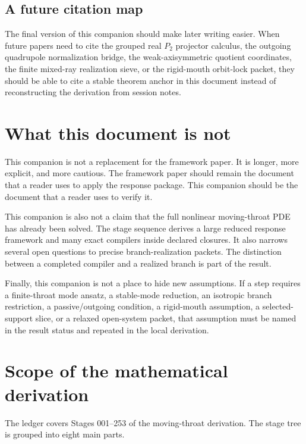 \subsection{A future citation map}

The final version of this companion should make later writing easier.  When future papers need to cite the grouped real \(P_2\) projector calculus, the outgoing quadrupole normalization bridge, the weak-axisymmetric quotient coordinates, the finite mixed-ray realization sieve, or the rigid-mouth orbit-lock packet, they should be able to cite a stable theorem anchor in this document instead of reconstructing the derivation from session notes.

\section{What this document is not}

This companion is not a replacement for the framework paper.  It is longer, more explicit, and more cautious.  The framework paper should remain the document that a reader uses to apply the response package.  This companion should be the document that a reader uses to verify it.

This companion is also not a claim that the full nonlinear moving-throat PDE has already been solved.  The stage sequence derives a large reduced response framework and many exact compilers inside declared closures.  It also narrows several open questions to precise branch-realization packets.  The distinction between a completed compiler and a realized branch is part of the result.

Finally, this companion is not a place to hide new assumptions.  If a step requires a finite-throat mode ansatz, a stable-mode reduction, an isotropic branch restriction, a passive/outgoing condition, a rigid-mouth assumption, a selected-support slice, or a relaxed open-system packet, that assumption must be named in the result status and repeated in the local derivation.

\section{Scope of the mathematical derivation}

The ledger covers Stages 001--253 of the moving-throat derivation.  The stage tree is grouped into eight main parts.

